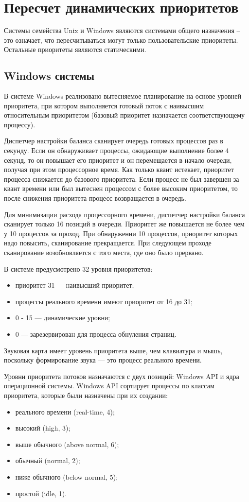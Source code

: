 \chapter{Пересчет динамических \newline приоритетов}
Системы семейства Unix и Windows являются системами общего назначения -- это означает, что пересчитываться могут только пользовательские приоритеты. Остальные приоритеты являются статическими.
\section{Windows системы}
В системе Windows реализовано вытесняемое планирование на основе уровней приоритета, при котором выполняется готовый поток с наивысшим относительным приоритетом (базовый приоритет назначается соответствующему процессу).

Диспетчер настройки баланса сканирует очередь готовых процессов раз в секунду. Если он обнаруживает процессы, ожидающие выполнение более 4 секунд, то он повышает его приоритет и он перемещается в начало очереди, получая при этом процессорное время. Как только квант истекает, приоритет процесса снижается до базового приоритета. Если процесс не был завершен за квант времени или был вытеснен процессом с более высоким приоритетом, то после снижения приоритета процесс возвращается в очередь. 

Для минимизации расхода процессорного времени, диспетчер настройки баланса сканирует только 16 позиций в очереди. Приоритет же повышается не более чем у 10 процессов за проход. При обнаружении 10 процессов, приоритет которых надо повысить, сканирование прекращается. При следующем проходе сканирование возобновляется с того места, где оно было прервано. 

В системе предусмотрено 32 уровня приоритетов:
\begin{itemize}
	\item приоритет 31 --- наивысший приоритет;
	\item процессы реального времени имеют приоритет от 16 до 31;
	\item 0 - 15 --- динамические уровни;
	\item 0 --- зарезервирован для процесса обнуления страниц.
\end{itemize}

Звуковая карта имеет уровень приоритета выше, чем клавиатура и мышь, поскольку формирование звука --- это процесс реального времени. 

Уровни приоритета потоков назначаются с двух позиций: Windows API и ядра операционной системы. Windows API сортирует процессы по классам приоритета, которые были назначены при их создании:
\begin{itemize}
	\item реального времени (real-time, 4);
	\item высокий (high, 3);
	\item выше обычного (above normal, 6);
	\item обычный (normal, 2);
	\item ниже обычного (below normal, 5);
	\item простой (idle, 1).
\end{itemize}

